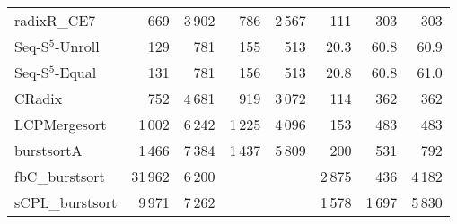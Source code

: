 \documentclass[a4paper]{myjournal}
\begin{document}
\begin{table}[p]
\begin{tabular}{l|rrrr*{3}{r}|}
     radixR\_CE7 &     669 & 3\,902 &    786 & 2\,567 &    111 &    303 &    303 \\
Seq-S$^5$-Unroll &     129 &    781 &    155 &    513 &   20.3 &   60.8 &   60.9 \\
 Seq-S$^5$-Equal &     131 &    781 &    156 &    513 &   20.8 &   60.8 &   61.0 \\
          CRadix &     752 & 4\,681 &    919 & 3\,072 &    114 &    362 &    362 \\
    LCPMergesort &  1\,002 & 6\,242 & 1\,225 & 4\,096 &    153 &    483 &    483 \\
      burstsortA &  1\,466 & 7\,384 & 1\,437 & 5\,809 &    200 &    531 &    792 \\
  fbC\_burstsort & 31\,962 & 6\,200 &        &        & 2\,875 &    436 & 4\,182 \\
 sCPL\_burstsort &  9\,971 & 7\,262 &        &        & 1\,578 & 1\,697 & 5\,830 \\ \hline
\end{tabular}
\end{table}
\end{document}
